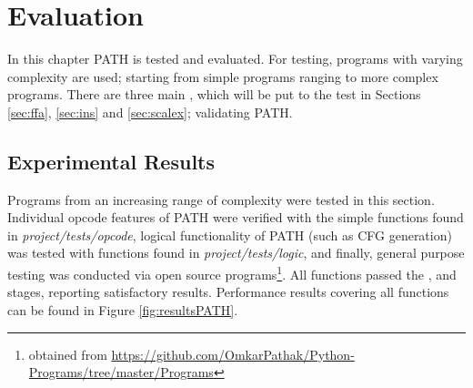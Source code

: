 \chapter{Evaluation}
    In this chapter \acs{PATH} is tested and evaluated. For testing, programs with varying complexity are used; starting from simple programs ranging to more complex programs. 
    There are three main , which will be put to the test in Sections \ref{sec:ffa}, \ref{sec:ins} and \ref{sec:scalex}; validating \acs{PATH}.
    
    \section{Experimental Results}
    \par Programs from an increasing range of complexity were tested in this section. Individual opcode features of \acs{PATH} were verified with the simple functions found in \textit{project/tests/opcode}, logical functionality of \acs{PATH} (such as \acs{CFG} generation) was tested with 
    functions found in \textit{project/tests/logic}, and finally, general purpose testing was conducted via open source programs\footnote{obtained from \url{https://github.com/OmkarPathak/Python-Programs/tree/master/Programs}}. All functions passed the ,  and 
    stages, reporting satisfactory results. Performance results covering all functions can be found in Figure \ref{fig:resultsPATH}. 
    
